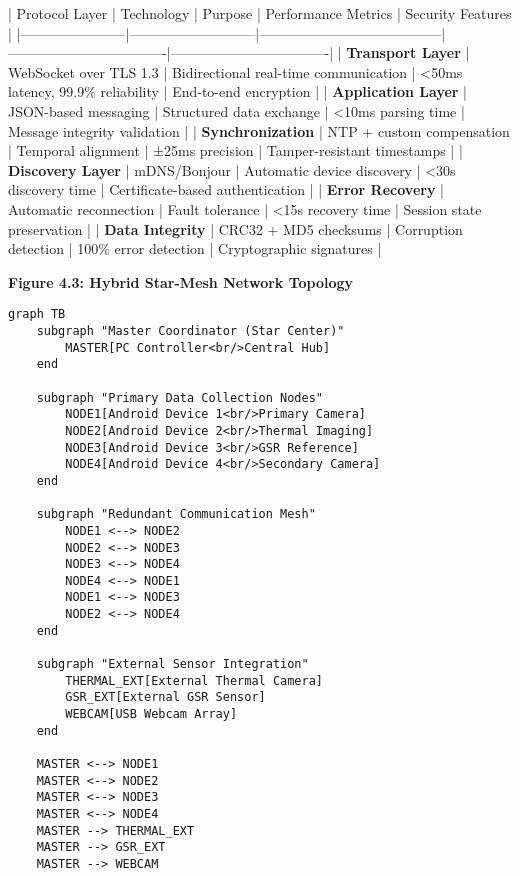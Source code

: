 \documentclass[12pt,a4paper]{article}
\begin{document}
| Protocol Layer        | Technology                | Purpose                               | Performance Metrics              | Security Features                |
|-----------------------|---------------------------|---------------------------------------|----------------------------------|----------------------------------|
| \textbf{Transport Layer}   | WebSocket over TLS 1.3    | Bidirectional real-time communication | <50ms latency, 99.9\% reliability | End-to-end encryption            |
| \textbf{Application Layer} | JSON-based messaging      | Structured data exchange              | <10ms parsing time               | Message integrity validation     |
| \textbf{Synchronization}   | NTP + custom compensation | Temporal alignment                    | ±25ms precision                  | Tamper-resistant timestamps      |
| \textbf{Discovery Layer}   | mDNS/Bonjour              | Automatic device discovery            | <30s discovery time              | Certificate-based authentication |
| \textbf{Error Recovery}    | Automatic reconnection    | Fault tolerance                       | <15s recovery time               | Session state preservation       |
| \textbf{Data Integrity}    | CRC32 + MD5 checksums     | Corruption detection                  | 100\% error detection             | Cryptographic signatures         |

\textbf{Figure 4.3: Hybrid Star-Mesh Network Topology}

\begin{verbatim}
graph TB
    subgraph "Master Coordinator (Star Center)"
        MASTER[PC Controller<br/>Central Hub]
    end

    subgraph "Primary Data Collection Nodes"
        NODE1[Android Device 1<br/>Primary Camera]
        NODE2[Android Device 2<br/>Thermal Imaging]
        NODE3[Android Device 3<br/>GSR Reference]
        NODE4[Android Device 4<br/>Secondary Camera]
    end

    subgraph "Redundant Communication Mesh"
        NODE1 <--> NODE2
        NODE2 <--> NODE3
        NODE3 <--> NODE4
        NODE4 <--> NODE1
        NODE1 <--> NODE3
        NODE2 <--> NODE4
    end

    subgraph "External Sensor Integration"
        THERMAL_EXT[External Thermal Camera]
        GSR_EXT[External GSR Sensor]
        WEBCAM[USB Webcam Array]
    end

    MASTER <--> NODE1
    MASTER <--> NODE2
    MASTER <--> NODE3
    MASTER <--> NODE4
    MASTER --> THERMAL_EXT
    MASTER --> GSR_EXT
    MASTER --> WEBCAM
\end{verbatim}
\end{document}
